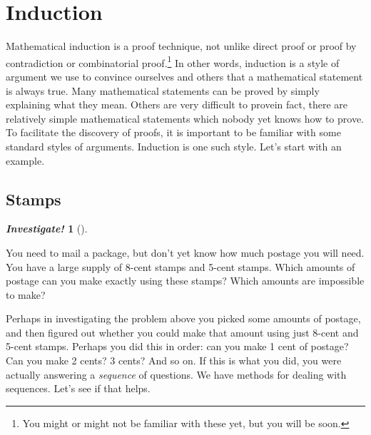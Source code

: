\documentclass[10pt,]{book}
\theoremstyle{plain}
\theoremstyle{definition}
\theoremstyle{definition}
\newtheorem{investigation}[project]{\emph{Investigate!}}
\theoremstyle{definition}
\numberwithin{equation}{chapter}
\begin{document}
\section[Induction]{Induction}\label{sec_seq-induction}
\typeout{************************************************}
\typeout{************************************************}

 Mathematical induction is a proof technique, not unlike direct proof or proof by contradiction or combinatorial proof.\footnote{You might or might not be familiar with these yet, but you will be soon.\label{fn-6}} In other words, induction is a style of argument we use to convince ourselves and others that a mathematical statement is always true. Many mathematical statements can be proved by simply explaining what they mean. Others are very difficult to prove\textemdash{}in fact, there are relatively simple mathematical statements which nobody yet knows how to prove. To facilitate the discovery of proofs, it is important to be familiar with some standard styles of arguments. Induction is one such style. Let's start with an example.
%
\typeout{************************************************}
\typeout{************************************************}
\subsection[Stamps]{Stamps}\label{subsec_induction-stamps}
\begin{investigation}[]\label{investigation-22}

You need to mail a package, but don't yet know how much postage you will need. You have
a large supply of 8-cent stamps and 5-cent stamps. Which amounts of postage can you make
exactly using these stamps? Which amounts are impossible to make?
%
\end{investigation}

Perhaps in investigating the problem above you picked some amounts of postage, and then figured out whether you could make that amount using just 8-cent and 5-cent stamps. Perhaps you did this in order: can you make 1 cent of postage? Can you make 2 cents? 3 cents? And so on. If this is what you did, you were actually answering a \emph{sequence} of questions. We have methods for dealing with sequences. Let's see if that helps.
%
\par
\end{document}
